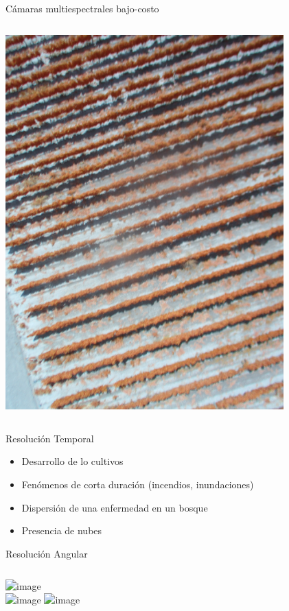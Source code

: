 \documentclass{beamer}
\begin{document}
\begin{frame}{Cámaras multiespectrales bajo-costo}
\begin{columns}
		\includegraphics[width=0.85\textwidth]{IMGs/ngb}
	\end{columns}
\end{frame}

\begin{frame}{Resolución Temporal}
	\begin{itemize}
		\item Desarrollo de lo cultivos
		\item Fenómenos de corta duración (incendios, inundaciones)
		\item Dispersión de una enfermedad en un bosque
		\item Presencia de nubes
	\end{itemize}
\end{frame}

\begin{frame}{Resolución Angular}
	\begin{columns}
		\centering
		\includegraphics<1->[width=0.6\textwidth]{IMGs/spot2}\\
		\includegraphics<2->[width=0.7\textwidth]{IMGs/spot1}
		\includegraphics<3->[width=0.85\textwidth]{IMGs/spot3}
	\end{columns}
\end{frame}
\end{document}
